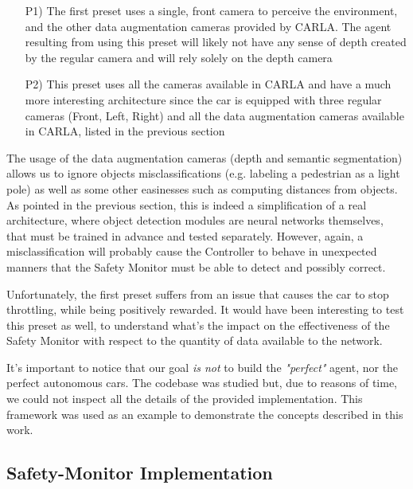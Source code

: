 \begin{itemize}
	\item[P1)] The first preset uses a single, front camera to perceive the environment, and the other data augmentation cameras provided by CARLA. The agent resulting from using this preset will likely not have any sense of depth created by the regular camera and will rely solely on the depth camera
	\item[P2)] This preset uses all the cameras available in CARLA and have a much more interesting architecture since the car is equipped with three regular cameras (Front, Left, Right) and all the data augmentation cameras available in CARLA, listed in the previous section
\end{itemize}

The usage of the data augmentation cameras (depth and semantic segmentation) allows us to ignore objects misclassifications (e.g. labeling a pedestrian as a light pole) as well as some other easinesses such as computing distances from objects. As pointed in the previous section, this is indeed a simplification of a real architecture, where object detection modules are neural networks themselves, that must be trained in advance and tested separately. However, again, a misclassification will probably cause the Controller to behave in unexpected manners that the Safety Monitor must be able to detect and possibly correct.

Unfortunately, the first preset suffers from an issue that causes the car to stop throttling, while being positively rewarded\cite{coachIssue}. It would have been interesting to test this preset as well, to understand what's the impact on the effectiveness of the Safety Monitor with respect to the quantity of data available to the network.\newline

It's important to notice that our goal \textsl{is not} to build the \textsl{"perfect"} agent, nor the perfect autonomous cars. The codebase was studied but, due to reasons of time, we could not inspect all the details of the provided implementation. This framework was used as an example to demonstrate the concepts described in this work.


\subsection{Safety-Monitor Implementation}

